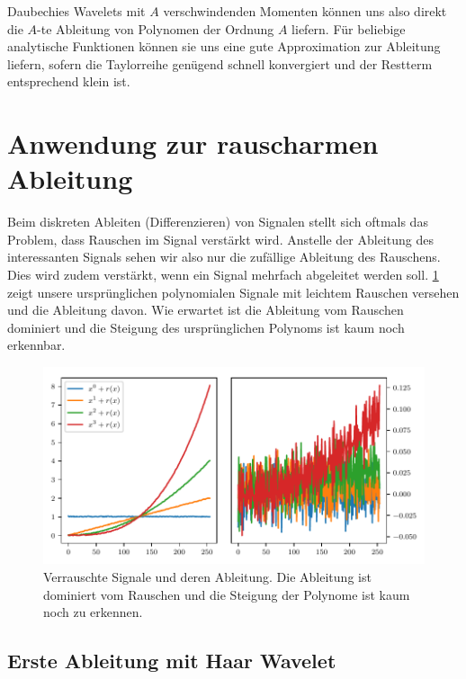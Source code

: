 \begin{refsection}
Daubechies Wavelets mit $A$ verschwindenden Momenten können uns also direkt die
$A$-te Ableitung von Polynomen der Ordnung $A$ liefern. Für beliebige
analytische Funktionen können sie uns eine gute Approximation zur Ableitung
liefern, sofern die Taylorreihe genügend schnell konvergiert und der Restterm
entsprechend klein ist.

\section{Anwendung zur rauscharmen Ableitung}
%

Beim diskreten Ableiten (Differenzieren) von Signalen stellt sich oftmals das
Problem, dass Rauschen im Signal verstärkt wird. Anstelle der Ableitung des
interessanten Signals sehen wir also nur die zufällige Ableitung des Rauschens.
Dies wird zudem verstärkt, wenn ein Signal mehrfach abgeleitet werden soll.
\cref{polynomials:noise:signals} zeigt unsere ursprünglichen polynomialen
Signale mit leichtem Rauschen versehen und die Ableitung davon. Wie erwartet
ist die Ableitung vom Rauschen dominiert und die Steigung des ursprünglichen
Polynoms ist kaum noch erkennbar.

\begin{figure}
    \centering
    \includegraphics{papers/polynomials/images/polynomials_noise_signals.pdf}
    \caption{Verrauschte Signale und deren Ableitung. Die Ableitung ist
             dominiert vom Rauschen und die Steigung der Polynome ist kaum noch
             zu erkennen.\label{polynomials:noise:signals}}
\end{figure}

\subsection{Erste Ableitung mit Haar Wavelet}


\end{refsection}
